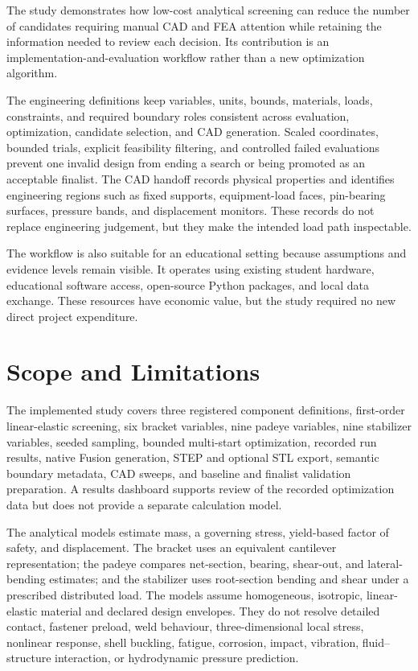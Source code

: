 The study demonstrates how low-cost analytical screening can reduce the number
of candidates requiring manual CAD and FEA attention while retaining the
information needed to review each decision. Its contribution is an
implementation-and-evaluation workflow rather than a new optimization
algorithm.

The engineering definitions keep variables, units, bounds, materials, loads,
constraints, and required boundary roles consistent across evaluation,
optimization, candidate selection, and CAD generation. Scaled coordinates,
bounded trials, explicit feasibility filtering, and controlled failed
evaluations prevent one invalid design from ending a search or being promoted
as an acceptable finalist. The CAD handoff records physical properties and
identifies engineering regions such as fixed supports, equipment-load faces,
pin-bearing surfaces, pressure bands, and displacement monitors. These records
do not replace engineering judgement, but they make the intended load path
inspectable.

The workflow is also suitable for an educational setting because assumptions
and evidence levels remain visible. It operates using existing student
hardware, educational software access, open-source Python packages, and local
data exchange. These resources have economic value, but the study required no
new direct project expenditure.

\section{Scope and Limitations}
\label{sec:scope}

The implemented study covers three registered component definitions,
first-order linear-elastic screening, six bracket variables, nine padeye
variables, nine stabilizer variables, seeded sampling, bounded multi-start
optimization, recorded run results, native Fusion generation, STEP and
optional STL export, semantic boundary metadata, CAD sweeps, and baseline and
finalist validation preparation. A results dashboard supports review of the
recorded optimization data but does not provide a separate calculation model.

The analytical models estimate mass, a governing stress, yield-based factor of
safety, and displacement. The bracket uses an equivalent cantilever
representation; the padeye compares net-section, bearing, shear-out, and
lateral-bending estimates; and the stabilizer uses root-section bending and
shear under a prescribed distributed load. The models assume homogeneous,
isotropic, linear-elastic material and declared design envelopes. They do not
resolve detailed contact, fastener preload, weld behaviour, three-dimensional
local stress, nonlinear response, shell buckling, fatigue, corrosion, impact,
vibration, fluid--structure interaction, or hydrodynamic pressure prediction.

